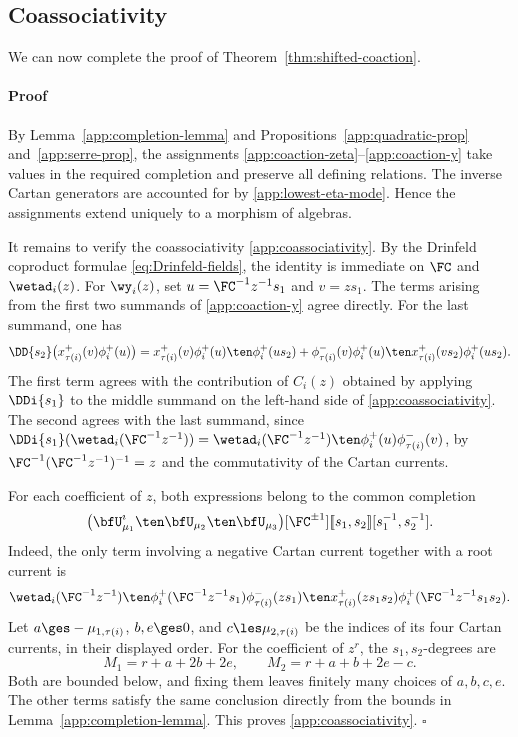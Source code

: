 \documentclass[reqno]{amsart}
\numberwithin{equation}{section}
\newenvironment{pf}{\medskip\paragraph{{\sc Proof}}}{\hfill$\square$\par\medskip}
\begin{document}
\subsection{Coassociativity}

\leavevmode We can now complete the proof of Theorem~\ref{thm:shifted-coaction}.

\begin{pf}
	By Lemma~\ref{app:completion-lemma} and Propositions~\ref{app:quadratic-prop} 
	and~\ref{app:serre-prop}, the assignments 
	\eqref{app:coaction-zeta}--\eqref{app:coaction-y} take values in the required 
	completion and preserve all defining relations. The inverse Cartan generators are 
	accounted for by \eqref{app:lowest-eta-mode}. Hence the assignments extend uniquely 
	to a morphism of algebras.

	It remains to verify the coassociativity \eqref{app:coassociativity}. By the Drinfeld 
	coproduct formulae \eqref{eq:Drinfeld-fields}, the identity is immediate on $\FC$ and 
	$\wetad_i(z)$. For $\wy_i(z)$, set $u={\FC^{-1}z^{-1}} s_1$ and $v=zs_1$. The terms arising 
	from the first two summands of \eqref{app:coaction-y} agree directly. For the last 
	summand, one has
	\[
	\DD{s_2}\bigl(x_{\tau(i)}^+(v)\phi_i^+(u)\bigr)
	=x_{\tau(i)}^+(v)\phi_i^+(u)\ten\phi_i^+(us_2)
	+\phi_{\tau(i)}^-(v)\phi_i^+(u)\ten x_{\tau(i)}^+(vs_2)\phi_i^+(us_2).
	\]
	The first term agrees with the contribution of $C_i(z)$ obtained by applying $\DDi{s_1}$ 
	to the middle summand on the left-hand side of \eqref{app:coassociativity}. The second 
	agrees with the last summand, since 
	$\DDi{s_1}(\wetad_i({\FC^{-1}z^{-1}}))=
	\wetad_i({\FC^{-1}z^{-1}})\ten\phi_i^+(u)\phi_{\tau(i)}^-(v)$, by 
	${\FC^{-1}(\FC^{-1}z^{-1})^{-1}}=z$ and the commutativity of the Cartan currents.
	
	For each coefficient of $z$, both expressions belong to the common
	completion
	\[
	\bigl(\bfU^\imath_{\mu_1}\ten\bfU_{\mu_2}\ten\bfU_{\mu_3}\bigr)
	[\FC^{\pm1}][\negthinspace[s_1,s_2]\negthinspace][s_1^{-1},s_2^{-1}].
	\]
	Indeed, the only term involving a negative Cartan current together
	with a root current is
	\[
	\wetad_i({\FC^{-1}z^{-1}})\ten
	\phi_i^+({\FC^{-1}z^{-1}} s_1)\phi_{\tau(i)}^-(zs_1)\ten
	x_{\tau(i)}^+(zs_1s_2)\phi_i^+({\FC^{-1}z^{-1}} s_1s_2).
	\]
	Let $a\ges-\mu_{1,\tau(i)}$, $b,e\ges0$, and
	$c\les\mu_{2,\tau(i)}$ be the indices of its four Cartan currents,
	in their displayed order. For the coefficient of $z^r$, the
	$s_1,s_2$-degrees are
	\[
	M_1=r+a+2b+2e,\qquad M_2=r+a+b+2e-c.
	\]
	Both are bounded below, and fixing them leaves finitely many
	choices of $a,b,c,e$. The other terms satisfy the same conclusion
	directly from the bounds in Lemma~\ref{app:completion-lemma}.
	This proves \eqref{app:coassociativity}.
\end{pf}
\end{document}
